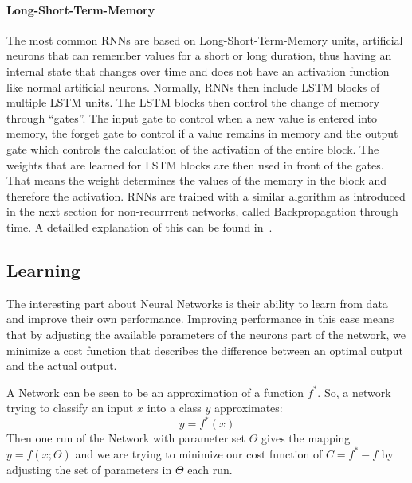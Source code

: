 \paragraph{Long-Short-Term-Memory} The most common RNNs are based on Long-Short-Term-Memory units, artificial neurons that can remember values for a short or long duration, thus having an internal state that changes over time and does not have an activation function like normal artificial neurons. Normally, RNNs then include LSTM blocks of multiple LSTM units. The LSTM blocks then control the change of memory through ``gates''. The input gate to control when a new value is entered into memory, the forget gate to control if a value remains in memory and the output gate which controls the calculation of the activation of the entire block. The weights that are learned for LSTM blocks are then used in front of the gates. That means the weight determines the values of the memory in the block and therefore the activation. RNNs are trained with a similar algorithm as introduced in the next section for non-recurrrent networks, called Backpropagation through time. A detailled explanation of this can be found in~\cite{58337}.


\subsection{Learning}
\label{sec:fund:Learn}
The interesting part about Neural Networks is their ability to learn from data and improve their own performance. Improving performance in this case means that by adjusting the available parameters of the neurons part of the network, we minimize a cost function that describes the difference between an optimal output and the actual output. 

A Network can be seen to be an approximation of a function \(f^*\). So, a network trying to classify an input \(x\) into a class \(y\) approximates:
\begin{equation}
\label{eq:learn}
y=f^*(x)
\end{equation}
Then one run of the Network with parameter set \(\Theta\) gives the mapping \(y = f(x;\Theta)\) and we are trying to minimize our cost function of \(C= f^* - f\) by adjusting the set of parameters in \(\Theta\) each run.

